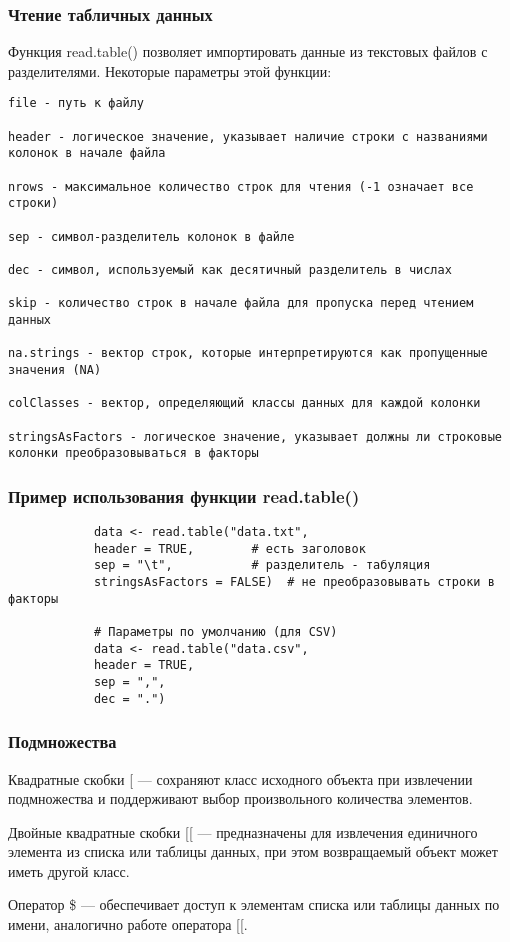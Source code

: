 \documentclass[10pt]{beamer}
\begin{document}
	
	\begin{frame}[fragile]
		\frametitle{Чтение табличных данных}
		Функция read.table() позволяет импортировать данные из текстовых файлов с разделителями. Некоторые параметры этой функции:
		{\fontsize{6}{7}\selectfont
		\begin{verbatim}
file - путь к файлу
			
header - логическое значение, указывает наличие строки с названиями колонок в начале файла
			
nrows - максимальное количество строк для чтения (-1 означает все строки)
			
sep - символ-разделитель колонок в файле
			
dec - символ, используемый как десятичный разделитель в числах
			
skip - количество строк в начале файла для пропуска перед чтением данных
			
na.strings - вектор строк, которые интерпретируются как пропущенные значения (NA)
			
colClasses - вектор, определяющий классы данных для каждой колонки
			
stringsAsFactors - логическое значение, указывает должны ли строковые колонки преобразовываться в факторы
		\end{verbatim}
	}
	\end{frame}
	
	
	\begin{frame}[fragile]
		\frametitle{Пример использования функции read.table()}
		\begin{verbatim}
			data <- read.table("data.txt", 
			header = TRUE,        # есть заголовок
			sep = "\t",           # разделитель - табуляция
			stringsAsFactors = FALSE)  # не преобразовывать строки в факторы
			
			# Параметры по умолчанию (для CSV)
			data <- read.table("data.csv", 
			header = TRUE,
			sep = ",",
			dec = ".")
		\end{verbatim}
	\end{frame}
	
	
	\begin{frame}[fragile]
		\frametitle{Подмножества}
		Квадратные скобки [ — сохраняют класс исходного объекта при извлечении подмножества и поддерживают выбор произвольного количества элементов.
		
		Двойные квадратные скобки [[ — предназначены для извлечения единичного элемента из списка или таблицы данных, при этом возвращаемый объект может иметь другой класс.
		
		Оператор \$ — обеспечивает доступ к элементам списка или таблицы данных по имени, аналогично работе оператора [[.
		
		
		
	\end{frame}
	
\end{document}
